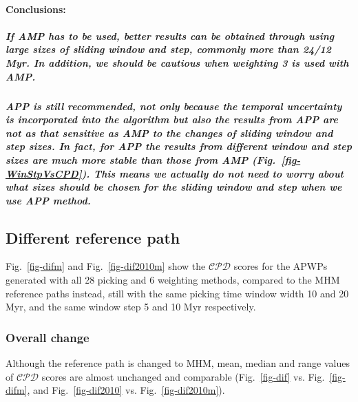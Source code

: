 \paragraph{Conclusions:}

\subparagraph{If AMP has to be used, better results can be obtained through
using large sizes of sliding window and step, commonly more than 24/12 Myr. In
addition, we should be cautious when weighting 3 is used with AMP.}

\subparagraph{APP is still recommended, not only because the temporal
uncertainty is incorporated into the algorithm but also the results from APP are
not as that sensitive as AMP to the changes of sliding window and step sizes. In
fact, for APP the results from different window and step sizes are much more
stable than those from AMP (Fig.~\ref{fig-WinStpVsCPD}). This means we actually
do not need to worry about what sizes should be chosen for the sliding window
and step when we use APP method.}


\subsection{Different reference path}

Fig.~\ref{fig-difm} and Fig.~\ref{fig-dif2010m} show the $\mathcal{CPD}$ scores
for the APWPs generated with all 28 picking and 6 weighting methods, compared to
the MHM reference paths instead, still with the same picking time window width
10 and 20 Myr, and the same window step 5 and 10 Myr respectively.

\subsubsection{Overall change}

Although the reference path is changed to MHM, mean, median and range values of
$\mathcal{CPD}$ scores are almost unchanged and comparable (Fig.~\ref{fig-dif}
vs. Fig.~\ref{fig-difm}, and Fig.~\ref{fig-dif2010} vs.
Fig.~\ref{fig-dif2010m}).

